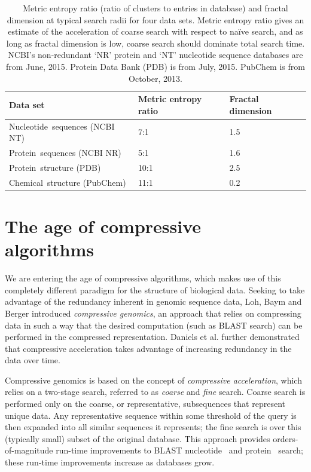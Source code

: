 \documentclass{acm_proc_article-sp}
\begin{document}
\begin{table}
\label{fractal}
\caption{Metric entropy ratio (ratio of clusters to entries in database) and
fractal dimension at typical search radii for four data sets. Metric entropy ratio gives an estimate of the acceleration of coarse search with respect to na\"ive search, and as long as fractal dimension is low, coarse search should dominate total search time.
NCBI's non-redundant `NR' protein and `NT' nucleotide sequence databases are from June, 2015. Protein Data Bank (PDB) is from July, 2015. PubChem is from October, 2013.}
\tabcolsep=0.11cm
\begin{tabular}{H{3.0cm}p{2.2cm}p{1.8cm}}
\hline
Data set & Metric entropy ratio & Fractal dimension \\        
\hline
Nucleotide~sequences (NCBI NT) & 7:1 & 1.5\\
\hline
Protein~sequences (NCBI NR) & 5:1 & 1.6\\
\hline
Protein~structure (PDB) & 10:1 & 2.5\\
\hline
Chemical~structure (PubChem) & 11:1 & 0.2\\
\hline
\end{tabular}
\end{table}

\section{The age of compressive\\ algorithms}\label{omics}

We are entering the age of compressive algorithms, 
which makes use of this completely different paradigm for the structure of biological data.
Seeking to take advantage of the redundancy inherent in genomic sequence data, 
Loh, Baym and Berger \cite{loh2012compressive}
introduced \emph{compressive genomics}, an approach that relies on compressing
data in such a way that the desired computation (such as BLAST search) can be
performed in the compressed representation.
Daniels et al. \cite{daniels2013compressive} further demonstrated that
compressive acceleration takes advantage of increasing redundancy in the
data over time.

Compressive genomics is based on the concept of \emph{compressive acceleration},
which relies on a two-stage search, referred to as \emph{coarse} and \emph{fine} search.
Coarse search is performed only on the coarse, or representative, subsequences
that represent unique data.
Any representative sequence within some threshold of the query is then expanded 
into all similar sequences it represents; the fine search is over this
(typically small) subset of the original database.
This approach provides orders-of-magnitude run-time improvements to BLAST 
nucleotide~\cite{loh2012compressive} and protein~\cite{daniels2013compressive}
search; these run-time improvements increase as databases grow.
\end{document}
